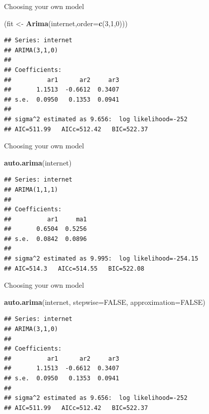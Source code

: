 \documentclass[14pt,ignorenonframetext,]{beamer}
\newenvironment{Shaded}{\begin{snugshade}}{\end{snugshade}}
\newcommand{\KeywordTok}[1]{\textcolor[rgb]{0.13,0.29,0.53}{\textbf{#1}}}
\newcommand{\DataTypeTok}[1]{\textcolor[rgb]{0.13,0.29,0.53}{#1}}
\newcommand{\DecValTok}[1]{\textcolor[rgb]{0.00,0.00,0.81}{#1}}
\newcommand{\StringTok}[1]{\textcolor[rgb]{0.31,0.60,0.02}{#1}}
\newcommand{\OtherTok}[1]{\textcolor[rgb]{0.56,0.35,0.01}{#1}}
\newcommand{\NormalTok}[1]{#1}
\begin{document}
\begin{frame}[fragile]{Choosing your own model}

\fontsize{13}{14}\sf

\begin{Shaded}
\begin{Highlighting}[]
\NormalTok{(fit <-}\StringTok{ }\KeywordTok{Arima}\NormalTok{(internet,}\DataTypeTok{order=}\KeywordTok{c}\NormalTok{(}\DecValTok{3}\NormalTok{,}\DecValTok{1}\NormalTok{,}\DecValTok{0}\NormalTok{)))}
\end{Highlighting}
\end{Shaded}

\begin{verbatim}
## Series: internet 
## ARIMA(3,1,0) 
## 
## Coefficients:
##          ar1      ar2     ar3
##       1.1513  -0.6612  0.3407
## s.e.  0.0950   0.1353  0.0941
## 
## sigma^2 estimated as 9.656:  log likelihood=-252
## AIC=511.99   AICc=512.42   BIC=522.37
\end{verbatim}

\end{frame}

\begin{frame}[fragile]{Choosing your own model}

\fontsize{13}{14}\sf

\begin{Shaded}
\begin{Highlighting}[]
\KeywordTok{auto.arima}\NormalTok{(internet)}
\end{Highlighting}
\end{Shaded}

\begin{verbatim}
## Series: internet 
## ARIMA(1,1,1) 
## 
## Coefficients:
##          ar1     ma1
##       0.6504  0.5256
## s.e.  0.0842  0.0896
## 
## sigma^2 estimated as 9.995:  log likelihood=-254.15
## AIC=514.3   AICc=514.55   BIC=522.08
\end{verbatim}

\end{frame}

\begin{frame}[fragile]{Choosing your own model}

\fontsize{13}{14}\sf

\begin{Shaded}
\begin{Highlighting}[]
\KeywordTok{auto.arima}\NormalTok{(internet, }\DataTypeTok{stepwise=}\OtherTok{FALSE}\NormalTok{,}
  \DataTypeTok{approximation=}\OtherTok{FALSE}\NormalTok{)}
\end{Highlighting}
\end{Shaded}

\begin{verbatim}
## Series: internet 
## ARIMA(3,1,0) 
## 
## Coefficients:
##          ar1      ar2     ar3
##       1.1513  -0.6612  0.3407
## s.e.  0.0950   0.1353  0.0941
## 
## sigma^2 estimated as 9.656:  log likelihood=-252
## AIC=511.99   AICc=512.42   BIC=522.37
\end{verbatim}

\end{frame}
\end{document}
